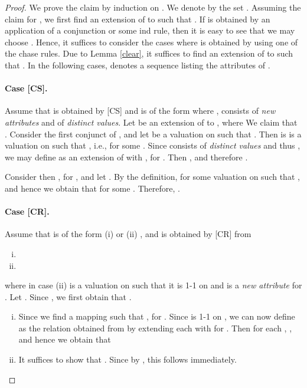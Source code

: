 \documentclass[envcountset]{llncs}
\begin{document}
\begin{proof}
We prove the claim by induction on . We denote by  the set . Assuming the claim for , we first find an extension  of  to  such that . If  is obtained by an application of a conjunction or some ind rule, then it is easy to see that we may choose . Hence, it suffices to consider the cases where  is obtained by using one of the chase rules. Due to Lemma \ref{clear}, it suffices to find an extension  of  to  such that . In the following cases,  denotes a sequence listing the attributes of .


\paragraph{\textbf{Case [CS].}} Assume that  is obtained by [CS] and is of the form 
where ,  consists of \emph{new attributes} and  of \emph{distinct values}. Let  be an extension of  to , where 
 We claim that . Consider the first conjunct of , and let  be a valuation on  such that . Then  is is a valuation on  such that , i.e.,  for some . Since  consists of \emph{distinct values} and thus , we may define  as an extension of  with , for . Then , and therefore .


Consider then , for , and let .
By the definition,  for some valuation  on  such that   , and hence we obtain that  for some . Therefore, .



\paragraph{\textbf{Case [CR].}} Assume that  is of the form (i)  or (ii) , and is obtained by [CR] from 

\begin{enumerate}[(i)]
\item 
\item 
\end{enumerate}
where in case (ii)  is a valuation on  such that it is 1-1 on   and  is a \emph{new attribute} for .  Let . Since ,   we first obtain that . \begin{enumerate}[(i)]
\item  Since  we find a mapping   such that , for . Since  is 1-1 on , we  can now define  as the relation obtained from  by extending each  with  for . Then for each ,  , and hence  we obtain that 
\item  It suffices to show that . Since  by , this follows immediately.
\end{enumerate}


\end{proof}
\end{document}
